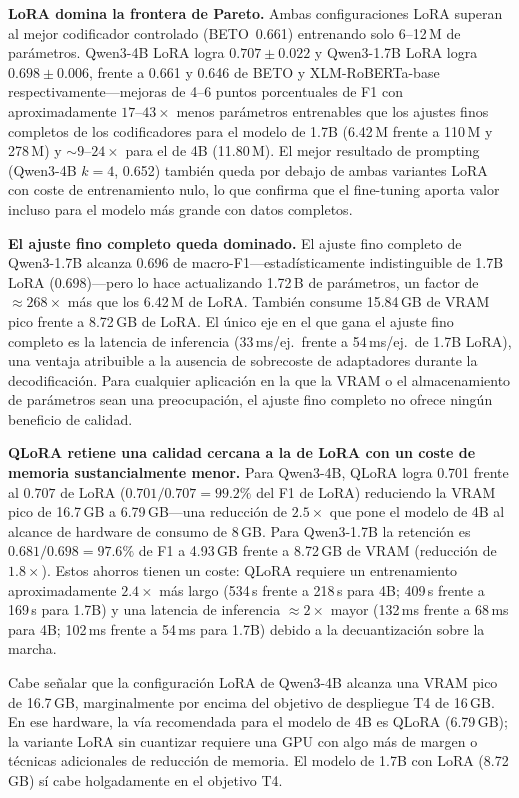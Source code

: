 \documentclass[conference]{IEEEtran}
\begin{document}
\textbf{LoRA domina la frontera de Pareto.}
Ambas configuraciones LoRA superan al mejor codificador controlado
(BETO~0.661) entrenando solo 6--12\,M de parámetros.
Qwen3-4B LoRA logra $0.707 \pm 0.022$ y Qwen3-1.7B LoRA logra
$0.698 \pm 0.006$, frente a 0.661 y 0.646 de BETO y XLM-RoBERTa-base
respectivamente---mejoras de 4--6 puntos porcentuales de F1 con aproximadamente
$17$--$43\times$ menos parámetros entrenables que los ajustes finos completos de
los codificadores para el modelo de 1.7B (6.42\,M frente a 110\,M y 278\,M) y
${\sim}9$--$24\times$ para el de 4B (11.80\,M).
El mejor resultado de prompting (Qwen3-4B $k=4$, 0.652) también queda por debajo
de ambas variantes LoRA con coste de entrenamiento nulo, lo que confirma que el
fine-tuning aporta valor incluso para el modelo más grande con datos completos.

\textbf{El ajuste fino completo queda dominado.}
El ajuste fino completo de Qwen3-1.7B alcanza 0.696 de macro-F1---estadísticamente
indistinguible de 1.7B LoRA (0.698)---pero lo hace actualizando
1.72\,B de parámetros, un factor de $\approx\!268\times$ más que los 6.42\,M de
LoRA.
También consume 15.84\,GB de VRAM pico frente a 8.72\,GB de LoRA.
El único eje en el que gana el ajuste fino completo es la latencia de inferencia
(33\,ms/ej.\ frente a 54\,ms/ej.\ de 1.7B LoRA), una ventaja atribuible a la
ausencia de sobrecoste de adaptadores durante la decodificación.  Para cualquier
aplicación en la que la VRAM o el almacenamiento de parámetros sean una
preocupación, el ajuste fino completo no ofrece ningún beneficio de calidad.

\textbf{QLoRA retiene una calidad cercana a la de LoRA con un coste de memoria sustancialmente menor.}
Para Qwen3-4B, QLoRA logra 0.701 frente al $0.707$ de LoRA
($0.701/0.707 = 99.2\%$ del F1 de LoRA) reduciendo la VRAM pico de
16.7\,GB a 6.79\,GB---una reducción de $2.5\times$ que pone el modelo de 4B al
alcance de hardware de consumo de 8\,GB.
Para Qwen3-1.7B la retención es $0.681/0.698 = 97.6\%$ de F1 a
4.93\,GB frente a 8.72\,GB de VRAM (reducción de $1.8\times$).
Estos ahorros tienen un coste: QLoRA requiere un entrenamiento aproximadamente
$2.4\times$ más largo (534\,s frente a 218\,s para 4B; 409\,s frente a 169\,s
para 1.7B) y una latencia de inferencia $\approx\!2\times$ mayor (132\,ms frente
a 68\,ms para 4B; 102\,ms frente a 54\,ms para 1.7B) debido a la decuantización
sobre la marcha.

Cabe señalar que la configuración LoRA de Qwen3-4B alcanza una VRAM pico de
16.7\,GB, marginalmente por encima del objetivo de despliegue T4 de 16\,GB.
En ese hardware, la vía recomendada para el modelo de 4B es QLoRA (6.79\,GB);
la variante LoRA sin cuantizar requiere una GPU con algo más de margen o
técnicas adicionales de reducción de memoria.
El modelo de 1.7B con LoRA (8.72\,GB) sí cabe holgadamente en el objetivo T4.
\end{document}

